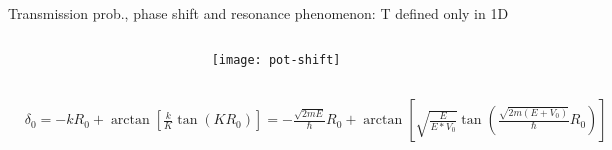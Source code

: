 \begin{frame}{Transmission prob., phase shift and resonance phenomenon: T defined only in 1D}
\begin{columns}[T]
\begin{column}{0.75\textwidth}
\begin{align*}
        \end{align*}
        \end{column}
        \begin{column}{0.25\textwidth}
            \begin{figure}[!ht]
            \texttt{[image: pot-shift]}\label{fig:pot-shift}
			\end{figure}
        \end{column}
    \end{columns}
    \begin{align*}
        &\delta_0=-kR_0+\arctan{[\frac{k}{K}\tan{(KR_0)}]}=-\frac{\sqrt{2mE}}{\hbar}R_0+\arctan{[\sqrt{\frac{E}{E*V_0}}\tan{(\frac{\sqrt{2m(E+V_0)}}{\hbar}R_0)}]}\\
        &
    \end{align*}
\end{frame}

